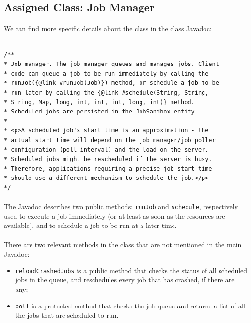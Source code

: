 \documentclass[english]{article}
\begin{document}
\subsection{Assigned Class: Job Manager}

\paragraph{}
We can find more specific details about the class in the class Javadoc:

\begin{lstlisting}

/**
* Job manager. The job manager queues and manages jobs. Client
* code can queue a job to be run immediately by calling the 
* runJob({@link #runJob(Job)}) method, or schedule a job to be 
* run later by calling the {@link #schedule(String, String,
* String, Map, long, int, int, int, long, int)} method.
* Scheduled jobs are persisted in the JobSandbox entity.
* 
* <p>A scheduled job's start time is an approximation - the
* actual start time will depend on the job manager/job poller
* configuration (poll interval) and the load on the server.
* Scheduled jobs might be rescheduled if the server is busy.
* Therefore, applications requiring a precise job start time 
* should use a different mechanism to schedule the job.</p>
*/
\end{lstlisting}

\paragraph{}
The Javadoc describes two public methods: \texttt{runJob} and \texttt{schedule}, respectively used to execute a job immediately (or at least as soon as the resources are available), and to schedule a job to be run at a later time. 

\paragraph{}
There are two relevant methods in the class that are not mentioned in the main Javadoc:
\begin{itemize}
	\item \texttt{reloadCrashedJobs} is a public method that checks the status of all scheduled jobs in the queue, and reschedules every job that has crashed, if there are any;
	\item \texttt{poll} is a protected method that checks the job queue and returns a list of all the jobs that are scheduled to run.
\end{itemize}
\end{document}
